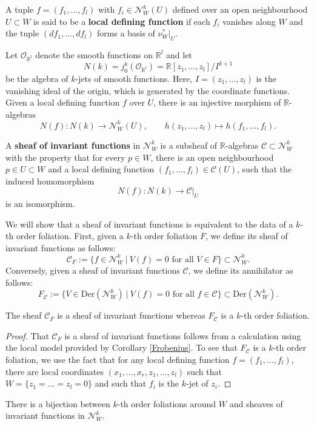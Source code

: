 \documentclass[10pt]{amsart}
\numberwithin{theoremalpha}{section}
\numberwithin{equation}{section}
\numberwithin{definition}{section}
\numberwithin{theorem}{section}
\numberwithin{proposition}{section}
\numberwithin{lemma}{section}
\numberwithin{example}{section}
\numberwithin{remark}{section}
\numberwithin{corollary}{section}
\numberwithin{question}{section}
\numberwithin{problem}{section}
\numberwithin{assumption}{section}
\theoremstyle{named}
\numberwithin{equation}{section}
\begin{document}
\begin{definition}
A tuple $f = (f_{1}, ..., f_{l})$ with $f_{i} \in \mathcal{N}_{W}^{k}(U)$ defined over an open neighbourhood $U \subset W$ is said to be a \textbf{local defining function} if each $f_{i}$ vanishes along $W$ and the tuple $(df_{1}, ..., df_{l})$ forms a basis of $\nu_{W}^{*}|_{U}$. 
\end{definition}

Let $\mathcal{O}_{\mathbb{R}^l}$ denote the smooth functions on $\mathbb{R}^l$ and let 
\[
N(k) = j_{0}^{k}(\mathcal{O}_{\mathbb{R}^l}) = \mathbb{R}[z_{1}, ..., z_{l}]/I^{k+1}
\]
be the algebra of $k$-jets of smooth functions. Here, $I = (z_{1}, ..., z_{l})$ is the vanishing ideal of the origin, which is generated by the coordinate functions. Given a local defining function $f$ over $U$, there is an injective morphism of $\mathbb{R}$-algebras 
\[
N(f) : N(k) \to \mathcal{N}_{W}^{k}(U), \qquad h(z_{1}, ..., z_{l}) \mapsto h(f_{1}, ..., f_{l}). 
\]

\begin{definition} 
A \textbf{sheaf of invariant functions} in $\mathcal{N}_{W}^{k}$ is a subsheaf of $\mathbb{R}$-algebras $\mathcal{C} \subset \mathcal{N}_{W}^{k}$ with the property that for every $p \in W$, there is an open neighbourhood $p \in U \subset W$ and a local defining function $(f_{1}, ..., f_{l}) \in \mathcal{C}(U)$, such that the induced homomorphism 
\[
N(f): N(k) \to \mathcal{C}|_{U}
\]
is an isomorphism. 
\end{definition}

We will show that a sheaf of invariant functions is equivalent to the data of a $k$-th order foliation. First, given a $k$-th order foliation $F$, we define its sheaf of invariant functions as follows: 
\[
\mathcal{C}_{F} := \{ f \in \mathcal{N}_{W}^{k} \ | \ V(f) = 0 \text{ for all } V \in F \} \subset \mathcal{N}_{W}^{k}. 
\]
Conversely, given a sheaf of invariant functions $\mathcal{C}$, we define its annihilator as follows: 
\[
F_{\mathcal{C}} := \{ V \in \mathrm{Der}(\mathcal{N}_{W}^{k}) \ | \ V(f) = 0 \text{ for all } f \in \mathcal{C} \} \subset \mathrm{Der}(\mathcal{N}_{W}^{k}). 
\] 
\begin{lemma}
The sheaf $\mathcal{C}_{F}$ is a sheaf of invariant functions whereas $F_{\mathcal{C}}$ is a $k$-th order foliation. 
\end{lemma}
\begin{proof}
That $\mathcal{C}_{F}$ is a sheaf of invariant functions follows from a calculation using the local model provided by Corollary \ref{Frobenius}. To see that $F_{\mathcal{C}}$ is a $k$-th order foliation, we use the fact that for any local defining function $f = (f_{1}, ..., f_{l})$, there are local coordinates $(x_{1}, ..., x_{r}, z_{1}, ..., z_{l})$ such that $W = \{ z_{1} = ... = z_{l} = 0 \}$ and such that $f_{i}$ is the $k$-jet of $z_{i}$. 
\end{proof}
\begin{proposition}
There is a bijection between $k$-th order foliations around $W$ and sheaves of invariant functions in $\mathcal{N}_{W}^{k}$. 
\end{proposition}
\end{document}
